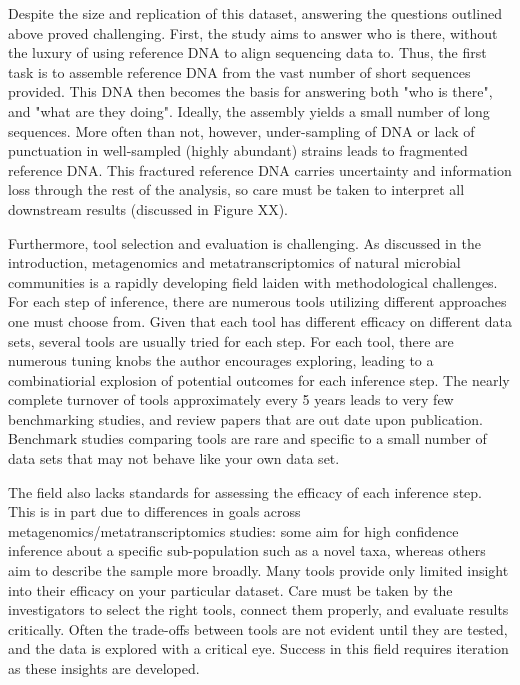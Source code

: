 Despite the size and replication of this dataset, answering the questions outlined above proved challenging.
First, the study aims to answer who is there, without the luxury of using reference DNA to align sequencing data to.
Thus, the first task is to assemble reference DNA from the vast number of short sequences provided.
This DNA then becomes the basis for answering both "who is there", and "what are they doing".
Ideally, the assembly yields a small number of long sequences.
More often than not, however, under-sampling of DNA or lack of punctuation in well-sampled (highly abundant) strains leads to fragmented reference DNA.
This fractured reference DNA carries uncertainty and information loss through the rest of the analysis, so care must be taken to interpret all downstream results (discussed in Figure XX).

Furthermore, tool selection and evaluation is challenging.
As discussed in the introduction, metagenomics and metatranscriptomics of natural microbial communities is a rapidly developing field laiden with methodological challenges.
For each step of inference, there are numerous tools utilizing different approaches one must choose from.
Given that each tool has different efficacy on different data sets, several tools are usually tried for each step.
For each tool, there are numerous tuning knobs the author encourages exploring, leading to a combinatiorial explosion of potential outcomes for each inference step.
The nearly complete turnover of tools approximately every 5 years leads to very few benchmarking studies, and review papers that are out date upon publication.
Benchmark studies comparing tools are rare and specific to a small number of data sets that may not behave like your own data set.

The field also lacks standards for assessing the efficacy of each inference step.
This is in part due to differences in goals across metagenomics/metatranscriptomics studies: some aim for high confidence inference about a specific sub-population such as a novel taxa, whereas others aim to describe the sample more broadly.
Many tools provide only limited insight into their efficacy on your particular dataset.
Care must be taken by the investigators to select the right tools, connect them properly, and evaluate results critically.
Often the trade-offs between tools are not evident until they are tested, and the data is explored with a critical eye.
Success in this field requires iteration as these insights are developed.

